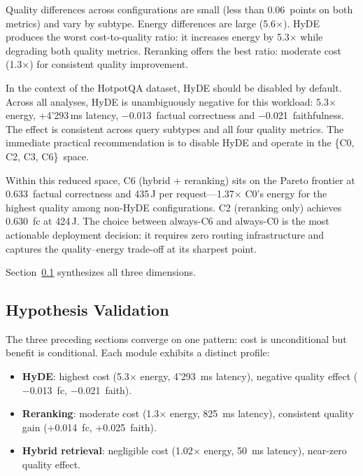 Quality differences across configurations are small (less than 0.06~points on
both metrics) and vary by subtype. Energy differences are large
(5.6$\times$). HyDE produces the worst cost-to-quality ratio: it increases
energy by 5.3$\times$ while degrading both quality metrics. Reranking offers
the best ratio: moderate cost (1.3$\times$) for consistent quality improvement.

In the context of the HotpotQA dataset, HyDE should be disabled by default.
Across all analyses, HyDE is unambiguously negative for this workload:
5.3$\times$ energy, +4{'}293\,ms latency, $-$0.013~factual correctness
and $-$0.021~faithfulness. The effect is consistent across query subtypes
and all four quality metrics. The immediate practical recommendation is to
disable HyDE and operate in the \{C0, C2, C3, C6\}~space.

Within this reduced space, C6 (hybrid + reranking) sits on the Pareto
frontier at 0.633~factual correctness and 435\,J per request---1.37$\times$
C0's energy for the highest quality among non-HyDE configurations. C2
(reranking only) achieves 0.630~fc at 424\,J. The choice between
always-C6 and always-C0 is the most actionable deployment decision: it
requires zero routing infrastructure and captures the quality--energy
trade-off at its sharpest point.

Section~\ref{subsec:hypothesis-validation} synthesizes all three dimensions.


\subsection{Hypothesis Validation}
\label{subsec:hypothesis-validation}


The three preceding sections converge on one pattern: cost is unconditional
but benefit is conditional. Each module exhibits a distinct profile:

\begin{itemize}
    \item \textbf{HyDE}: highest cost (5.3$\times$ energy, 4{'}293~ms
          latency), negative quality effect ($-$0.013~fc, $-$0.021~faith).
    \item \textbf{Reranking}: moderate cost (1.3$\times$ energy, 825~ms
          latency), consistent quality gain (+0.014~fc, +0.025~faith).
    \item \textbf{Hybrid retrieval}: negligible cost (1.02$\times$ energy,
          50~ms latency), near-zero quality effect.
\end{itemize}

